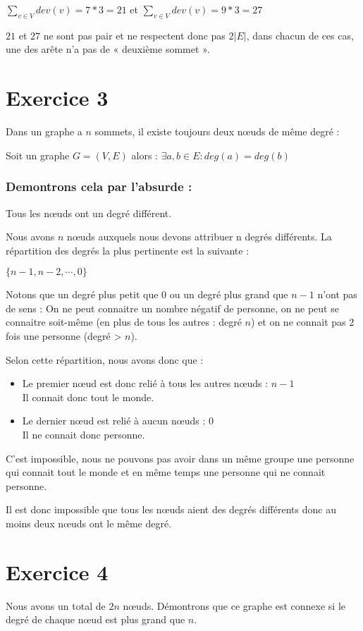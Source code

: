 \documentclass[fontsize=10pt]{article}
\begin{document}
{\centering $\displaystyle\sum_{v \in V} dev(v) = 7 * 3 = 21$ et $\displaystyle\sum_{v \in V} dev(v) = 9 * 3 = 27$ }

$21$ et $27$ ne sont pas pair et ne respectent donc pas $2 |E|$, dans chacun de ces cas, une des arête n'a pas de « deuxième sommet ».

\section*{Exercice 3}
    Dans un graphe a $n$ sommets, il existe toujours deux nœuds de même degré :

    Soit un graphe $G = (V, E)$ alors : $\exists a, b \in E : deg(a) = deg(b)$

\subsubsection*{Demontrons cela par l'absurde :}
Tous les nœuds ont un degré différent.

Nous avons $n$ nœuds auxquels nous devons attribuer n degrés différents.
La répartition des degrés la plus pertinente est la suivante :

$\{ n - 1, n - 2, \cdots, 0\}$

Notons que un degré plus petit que $0$ ou un degré plus grand que $n - 1$ n'ont pas de sens : On ne peut connaitre un nombre négatif de personne, on ne peut se connaitre soit-même (en plus de tous les autres : degré $n$) et on ne connait pas 2 fois une personne (degré > $n$).

Selon cette répartition, nous avons donc que :
\begin{itemize}
    \itemsep0em
    \item Le premier nœud est donc relié à tous les autres nœuds : $n - 1$\\
        Il connait donc tout le monde.
    \item Le dernier nœud est relié à aucun nœuds : $0$\\
        Il ne connait donc personne.
\end{itemize}
C'est impossible, nous ne pouvons pas avoir dans un même groupe une personne
qui connait tout le monde et en même temps une personne qui ne connait
personne.

Il est donc impossible que tous les nœuds aient des degrés
différents donc au moins deux nœuds ont le même degré.

\section*{Exercice 4}
Nous avons un total de $2n$ nœuds. Démontrons que ce graphe est connexe si le
degré de chaque nœud est plus grand que $n$.
\end{document}
